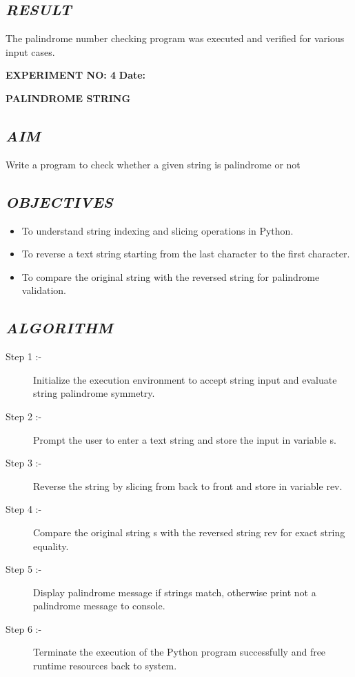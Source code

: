 \documentclass[11pt,a4paper]{article}
\begin{document}
\subsection*{\textit{RESULT}}
The palindrome number checking program was executed and verified for various input cases.

\newpage

\noindent
\textbf{\large EXPERIMENT NO: 4} \hfill \textbf{\large Date: \underline{\hspace{3cm}}}

\vspace{0.2cm}
\begin{center}
{\Huge \textbf{\textcolor{navyblue}{PALINDROME STRING}}}
\end{center}
\vspace{0.3cm}

\subsection*{\textit{AIM}}
Write a program to check whether a given string is palindrome or not

\subsection*{\textit{OBJECTIVES}}
\begin{itemize}
  \item To understand string indexing and slicing operations in Python.
  \item To reverse a text string starting from the last character to the first character.
  \item To compare the original string with the reversed string for palindrome validation.
\end{itemize}

\subsection*{\textit{ALGORITHM}}
\begin{description}
  \item[Step 1 :-] Initialize the execution environment to accept string input and evaluate string palindrome symmetry.
  \item[Step 2 :-] Prompt the user to enter a text string and store the input in variable s.
  \item[Step 3 :-] Reverse the string by slicing from back to front and store in variable rev.
  \item[Step 4 :-] Compare the original string s with the reversed string rev for exact string equality.
  \item[Step 5 :-] Display palindrome message if strings match, otherwise print not a palindrome message to console.
  \item[Step 6 :-] Terminate the execution of the Python program successfully and free runtime resources back to system.
\end{description}
\end{document}
